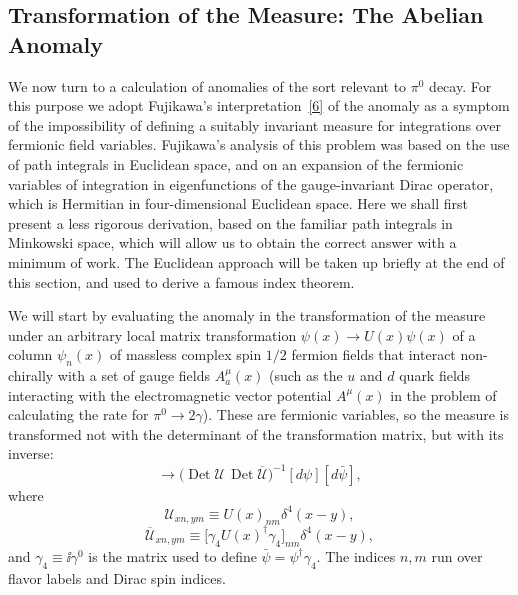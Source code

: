 \subsection{Transformation of the Measure: The Abelian Anomaly}
\label{sec:22.2}

We now turn to a calculation of anomalies of the sort relevant to $\pi^0$
decay. For this purpose we adopt Fujikawa's
interpretation~\hyperref[ch22-ref-6]{[6]} of the anomaly as a symptom of
the impossibility of defining a suitably invariant measure for integrations
over fermionic field variables. Fujikawa's analysis of this problem was
based on the use of path integrals in Euclidean space, and on an expansion
of the fermionic variables of integration in eigenfunctions of the
gauge-invariant Dirac operator, which is Hermitian in four-dimensional
Euclidean space. Here we shall first present a less rigorous derivation,
based on the familiar path integrals in Minkowski space, which will allow
us to obtain the correct answer with a minimum of work. The Euclidean
approach will be taken up briefly at the end of this section, and used to
derive a famous index theorem.

We will start by evaluating the anomaly in the transformation of the
measure under an arbitrary local matrix transformation
$\psi(x)\to U(x)\psi(x)$ of a column $\psi_n(x)$ of massless complex spin
$1/2$ fermion fields that interact non-chirally with a set of gauge fields
$A_a^\mu(x)$ (such as the $u$ and $d$ quark fields interacting with
the electromagnetic vector potential $A^\mu(x)$ in the problem of
calculating the rate for $\pi^0\to2\gamma$). These are fermionic variables,
so the measure is transformed not with the determinant of the
transformation matrix, but with its inverse:
\begin{equation}
 [d\psi][d\bar\psi]\longrightarrow
 \bigl(\operatorname{Det}\mathcal U\,
       \operatorname{Det}\overline{\mathcal U}\bigr)^{-1}
 [d\psi][d\bar\psi],
 \tag{22.2.1}\label{eq:22.2.1}
\end{equation}
where
\begin{equation}
 \mathcal U_{xn,ym}\equiv U(x)_{nm}\delta^4(x-y),
 \tag{22.2.2}\label{eq:22.2.2}
\end{equation}
\begin{equation}
 \overline{\mathcal U}_{xn,ym}
 \equiv\bigl[\gamma_4U(x)^\dagger\gamma_4\bigr]_{nm}\delta^4(x-y),
 \tag{22.2.3}\label{eq:22.2.3}
\end{equation}
and $\gamma_4\equiv \ii\gamma^0$ is the matrix used to define
$\bar\psi=\psi^\dagger\gamma_4$. The indices $n,m$ run over flavor labels
and Dirac spin indices.

